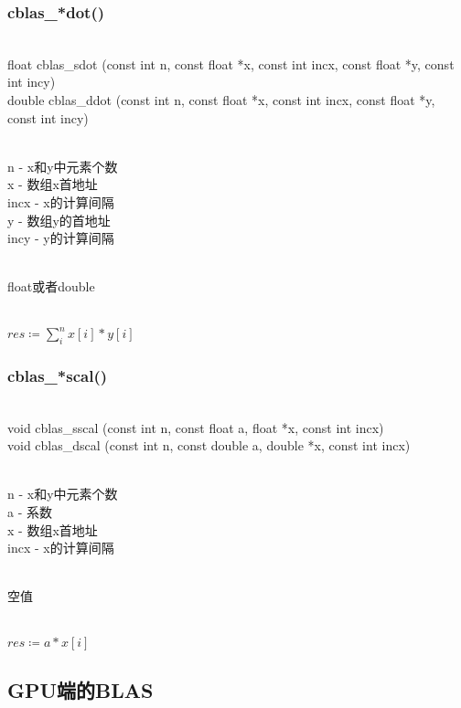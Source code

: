 \subsubsection{cblas\_*dot()}
\begin{cnfrmfunc}
   \item{}\\ 
     float cblas\_sdot (const int n, const float *x, const int incx, const float *y, const int incy)\\
     double cblas\_ddot (const int n, const float *x, const int incx, const float *y, const int incy)
   \item{}\\
     n - x和y中元素个数\\
     x - 数组x首地址\\
     incx - x的计算间隔\\
     y - 数组y的首地址\\
     incy - y的计算间隔
   \item{}\\
     float或者double
   \item{}\\
     $res\coloneqq \sum\limits_{i}^{n}x[i]*y[i]$
\end{cnfrmfunc}
\subsubsection{cblas\_*scal()}
\begin{cnfrmfunc}
  \item{}\\
    void cblas\_sscal (const int n, const float a, float *x, const int incx)\\
    void cblas\_dscal (const int n, const double a, double *x, const int incx)
   \item{}\\
     n - x和y中元素个数\\
     a - 系数\\
     x - 数组x首地址\\
     incx - x的计算间隔\\
   \item{}\\
     空值
   \item{}\\
     $res\coloneqq a * x[i]$
\end{cnfrmfunc}   
   
\subsection{GPU端的BLAS}\label{deps/blas/gpu}
